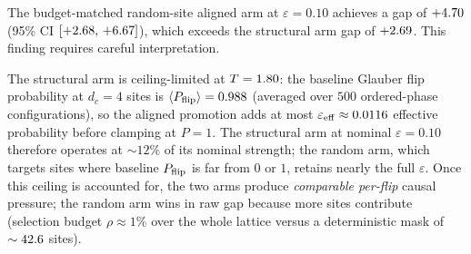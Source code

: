 \documentclass[aps,pre,preprint,superscriptaddress,showpacs]{revtex4-2}
\begin{document}
The budget-matched random-site aligned arm at $\varepsilon=0.10$ achieves
a gap of $+4.70$ (95\% CI $[+2.68,\,+6.67]$),
which exceeds the structural arm gap of $+2.69$.
This finding requires careful interpretation.

The structural arm is ceiling-limited at $T=1.80$: the baseline
Glauber flip probability at $d_c=4$ sites is
$\langle P_{\rm flip}\rangle = 0.988$ (averaged over
$500$ ordered-phase configurations), so the aligned promotion adds at most
$\varepsilon_{\rm eff}\approx 0.0116$ effective probability before
clamping at $P=1$.
The structural arm at nominal $\varepsilon=0.10$ therefore operates
at $\sim 12\%$ of its nominal strength; the random arm, which targets
sites where baseline $P_{\rm flip}$ is far from $0$ or $1$, retains
nearly the full $\varepsilon$.
Once this ceiling is accounted for, the two arms produce \emph{comparable
per-flip} causal pressure; the random arm wins in raw gap because more
sites contribute (selection budget $\rho\approx 1\%$ over the whole
lattice versus a deterministic mask of $\sim 42.6$ sites).
\end{document}
